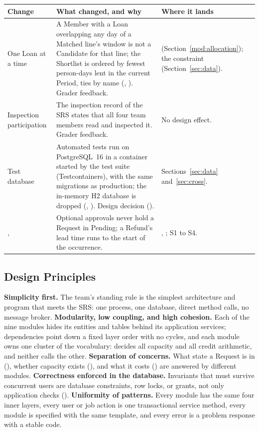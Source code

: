 {\small\renewcommand{\arraystretch}{1.1}
\begin{tabularx}{\textwidth}{@{}L{2.3cm}YL{4.6cm}@{}}
\toprule
\textbf{Change} & \textbf{What changed, and why} & \textbf{Where it lands} \\
\midrule
{} One Loan at a time &
A Member with a Loan overlapping any day of a Matched line's window is not a Candidate for that line; the Shortlist is ordered by fewest person-days lent in the current Period, ties by name (, ). Grader feedback. &
 (Section~\ref{mod:allocation}); the  constraint (Section~\ref{sec:data}). \\
 Inspection participation &
The inspection record of the SRS states that all four team members read and inspected it. Grader feedback. &
No design effect. \\
 Test database &
Automated tests run on PostgreSQL~16 in a container started by the test suite (Testcontainers), with the same migrations as production; the in-memory H2 database is dropped (, ). Design decision (). &
Sections~\ref{sec:data} and~\ref{sec:cross}. \\
,  &
Optional approvals never hold a Request in Pending; a Refund's lead time runs to the start of the occurrence. &
, ; S1 to S4. \\
\bottomrule
\end{tabularx}
}

\subsection{Design Principles}

\textbf{Simplicity first.} The team's standing rule is the simplest architecture and program that meets the SRS: one process, one database, direct method calls, no message broker. \textbf{Modularity, low coupling, and high cohesion.} Each of the nine modules hides its entities and tables behind its application services; dependencies point down a fixed layer order with no cycles, and each module owns one cluster of the vocabulary:  decides all capacity and  all credit arithmetic, and neither calls the other. \textbf{Separation of concerns.} What state a Request is in (), whether capacity exists (), and what it costs () are answered by different modules. \textbf{Correctness enforced in the database.} Invariants that must survive concurrent users are database constraints, row locks, or grants, not only application checks (). \textbf{Uniformity of patterns.} Every module has the same four inner layers, every user or job action is one transactional service method, every module is specified with the same template, and every error is a problem response with a stable code.

